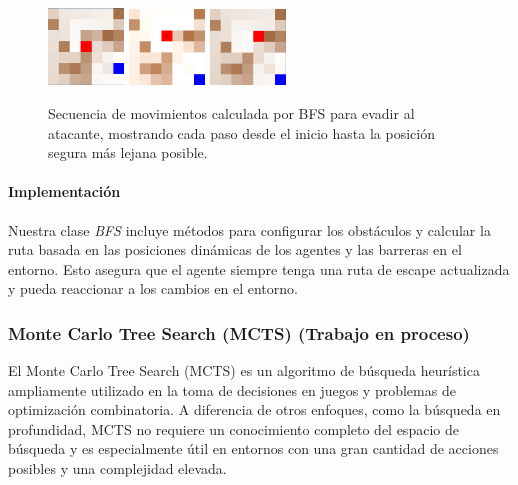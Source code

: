 \documentclass[11pt]{article}
\begin{document}
\begin{figure}[H]
    \centering
    \includegraphics[width=0.18\textwidth]{images/image6.png}\hfill
    \includegraphics[width=0.18\textwidth]{images/image7.png}\hfill
    \includegraphics[width=0.18\textwidth]{images/image8.png}
    \caption{Secuencia de movimientos calculada por BFS para evadir al atacante, mostrando cada paso desde el inicio hasta la posición segura más lejana posible.}
\end{figure}

\paragraph{Implementación}
Nuestra clase \textit{BFS} incluye métodos para configurar los obstáculos y calcular la ruta basada en las posiciones dinámicas de los agentes y las barreras en el entorno. Esto asegura que el agente siempre tenga una ruta de escape actualizada y pueda reaccionar a los cambios en el entorno.



\subsubsection{Monte Carlo Tree Search (MCTS) (Trabajo en proceso)}
El Monte Carlo Tree Search (MCTS) es un algoritmo de búsqueda heurística ampliamente utilizado en la toma de decisiones en juegos y problemas de optimización combinatoria. A diferencia de otros enfoques, como la búsqueda en profundidad, MCTS no requiere un conocimiento completo del espacio de búsqueda y es especialmente útil en entornos con una gran cantidad de acciones posibles y una complejidad elevada.\\
\end{document}
